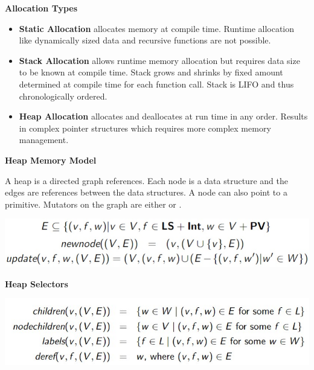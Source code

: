 \begin{center}
     \textbf{Allocation Types}
\end{center}
\begin{itemize}
    \item \textbf{Static Allocation} allocates memory at compile time. Runtime allocation like dynamically sized data and recursive functions are not possible. 
    \item \textbf{Stack Allocation} allows runtime memory allocation but requires data size to be known at compile time. Stack grows and shrinks by fixed amount determined at compile time for each function call. Stack is LIFO and thus chronologically ordered.
    \item \textbf{Heap Allocation} allocates and deallocates at run time in any order. Results in complex pointer structures which requires more complex memory management. 
\end{itemize}

\begin{center}
    \textbf{Heap Memory Model}
\end{center}
A heap is a directed graph references. Each node is a data structure and the edges are references between the data structures. A node can also point to a primitive. Mutators on the graph are either  or .
\begin{center}
    \includegraphics[scale=0.5]{images/heap model.jpg}
\end{center}

\begin{center}
    \textbf{Heap Selectors}
\end{center}
\begin{center}
    \includegraphics[scale=0.6]{images/heap selectors.jpg}
\end{center}

